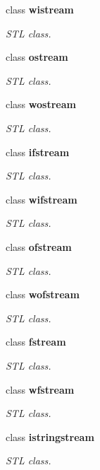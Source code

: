 \begin{DoxyCompactItemize}
class {\bfseries wistream}
\begin{DoxyCompactList}\small\item\em STL class. \end{DoxyCompactList}\item 
class {\bfseries ostream}
\begin{DoxyCompactList}\small\item\em STL class. \end{DoxyCompactList}\item 
class {\bfseries wostream}
\begin{DoxyCompactList}\small\item\em STL class. \end{DoxyCompactList}\item 
class {\bfseries ifstream}
\begin{DoxyCompactList}\small\item\em STL class. \end{DoxyCompactList}\item 
class {\bfseries wifstream}
\begin{DoxyCompactList}\small\item\em STL class. \end{DoxyCompactList}\item 
class {\bfseries ofstream}
\begin{DoxyCompactList}\small\item\em STL class. \end{DoxyCompactList}\item 
class {\bfseries wofstream}
\begin{DoxyCompactList}\small\item\em STL class. \end{DoxyCompactList}\item 
class {\bfseries fstream}
\begin{DoxyCompactList}\small\item\em STL class. \end{DoxyCompactList}\item 
class {\bfseries wfstream}
\begin{DoxyCompactList}\small\item\em STL class. \end{DoxyCompactList}\item 
class {\bfseries istringstream}
\begin{DoxyCompactList}\small\item\em STL class. \end{DoxyCompactList}\item 

\end{DoxyCompactItemize}
